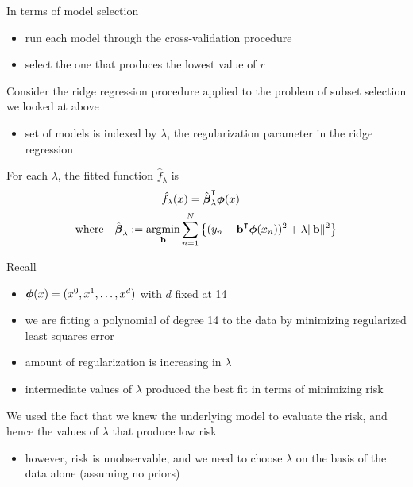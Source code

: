 \begin{frame}

    \vspace{2em}
    In terms of model selection
    \begin{itemize}
        \item   run each model through the
    cross-validation procedure
        \item select the one that produces the lowest
    value of $r$
    \end{itemize}
    
    Consider the ridge regression procedure applied to the problem of subset selection we looked at above
    \begin{itemize}
        \item set of models is indexed by $\lambda$, the regularization
    parameter in the ridge regression
    \end{itemize}
    
    \vspace{.7em}
    For each $\lambda$,
    the fitted function $\hat f_{\lambda}$ is 
    \begin{equation*}
    \hat f_{\lambda}(x) = \hboldbeta_{\lambda}^\T \boldphi(x)
    \quad
    \end{equation*}
    \begin{equation*}
    \text{where} \quad
    \hboldbeta_{\lambda} :=
    \argmin_{\boldb} \sum_{n=1}^N 
        \left\{
        (y_n - \boldb^\T\boldphi(x_n))^2 + \lambda \| \boldb \|^2
        \right\}
    \end{equation*}
    
\end{frame}

\begin{frame}

    \vspace{2em}
    Recall 
    \begin{itemize}
        \item  ${\boldsymbol \phi}(x) = (x^0, x^1,\ldots, x^d)$ with $d$ fixed at 14
        \item we are fitting a polynomial of degree 14 to the data by minimizing
    regularized least squares error
        \item amount of regularization is increasing
    in $\lambda$
        \item  intermediate values of
    $\lambda$ produced the best fit in terms of minimizing risk
    \end{itemize}
    
    \vspace{.7em}
    We used the fact that we knew the underlying model to
    evaluate the risk, and hence
    the values of $\lambda$ that produce low risk
    
    \begin{itemize}
        \item  however, risk is unobservable, and we need to choose
        $\lambda$ on the basis of the data alone (assuming no priors)
    \end{itemize}
 
\end{frame}

